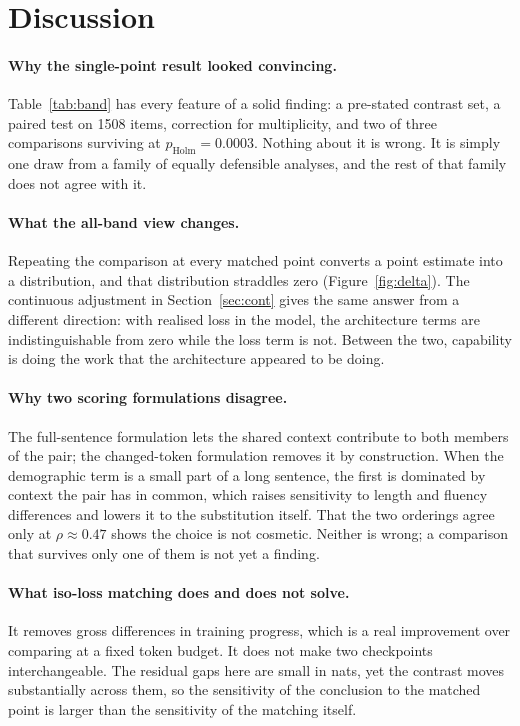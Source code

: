\documentclass[sigconf,natbib=true,anonymous=true]{acmart}
\begin{document}
\section{Discussion}

\paragraph{Why the single-point result looked convincing.}
Table~\ref{tab:band} has every feature of a solid finding: a pre-stated contrast
set, a paired test on 1508 items, correction for multiplicity, and two of three
comparisons surviving at $p_{\text{Holm}} = 0.0003$. Nothing about it is wrong.
It is simply one draw from a family of equally defensible analyses, and the rest
of that family does not agree with it.

\paragraph{What the all-band view changes.}
Repeating the comparison at every matched point converts a point estimate into a
distribution, and that distribution straddles zero
(Figure~\ref{fig:delta}). The continuous adjustment in Section~\ref{sec:cont}
gives the same answer from a different direction: with realised loss in the
model, the architecture terms are indistinguishable from zero while the loss term
is not. Between the two, capability is doing the work that the architecture
appeared to be doing.

\paragraph{Why two scoring formulations disagree.}
The full-sentence formulation lets the shared context contribute to both members
of the pair; the changed-token formulation removes it by construction. When the
demographic term is a small part of a long sentence, the first is dominated by
context the pair has in common, which raises sensitivity to length and fluency
differences and lowers it to the substitution itself. That the two orderings
agree only at $\rho \approx 0.47$ shows the choice is not cosmetic. Neither is
wrong; a comparison that survives only one of them is not yet a finding.

\paragraph{What iso-loss matching does and does not solve.}
It removes gross differences in training progress, which is a real improvement
over comparing at a fixed token budget. It does not make two checkpoints
interchangeable. The residual gaps here are small in nats, yet the contrast moves
substantially across them, so the sensitivity of the conclusion to the matched
point is larger than the sensitivity of the matching itself.
\end{document}
